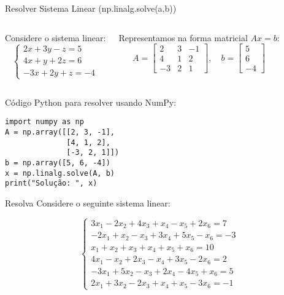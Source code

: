 \begin{frame}[fragile]{Resolver Sistema Linear (np.linalg.solve(a,b))}
    \begin{columns}[T] %
        Considere o sistema linear:
        \[
            \begin{cases}
                2x + 3y - z = 5 \\
                4x + y + 2z = 6 \\
                -3x + 2y + z = -4
            \end{cases}
        \]

        Representamos na forma matricial \(Ax = b\):
        \[
            A = \begin{bmatrix}
                2  & 3 & -1 \\
                4  & 1 & 2  \\
                -3 & 2 & 1
            \end{bmatrix},
            \quad
            b = \begin{bmatrix}
                5 \\ 6 \\ -4
            \end{bmatrix}
        \]
    \end{columns}

    \vspace{0.4cm}

    Código Python para resolver usando NumPy:
    \begin{verbatim}
import numpy as np
A = np.array([[2, 3, -1],
              [4, 1, 2],
              [-3, 2, 1]])
b = np.array([5, 6, -4])
x = np.linalg.solve(A, b)
print("Solução: ", x)
  \end{verbatim}
\end{frame}

\begin{frame}{Resolva}
    Considere o seguinte sistema linear:

    \[
        \begin{cases}
            3x_1 - 2x_2 + 4x_3 + x_4 - x_5 + 2x_6 = 7  \\
            -2x_1 + x_2 - x_3 + 3x_4 + 5x_5 - x_6 = -3 \\
            x_1 + x_2 + x_3 + x_4 + x_5 + x_6 = 10     \\
            4x_1 - x_2 + 2x_3 - x_4 + 3x_5 - 2x_6 = 2  \\
            -3x_1 + 5x_2 - x_3 + 2x_4 - 4x_5 + x_6 = 5 \\
            2x_1 + 3x_2 - 2x_3 + x_4 + x_5 - 3x_6 = -1
        \end{cases}
    \]
\end{frame}

